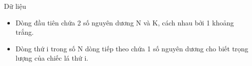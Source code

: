 Dữ liệu  
\begin{itemize}
	\item     Dòng đầu tiên chứa 2 số nguyên dương N và K, cách nhau bởi 1 khoảng trắng.   
	\item     Dòng thứ i trong số N dòng tiếp theo chứa 1 số nguyên dương cho biết trọng lượng của chiếc lá thứ i.   
\end{itemize}
